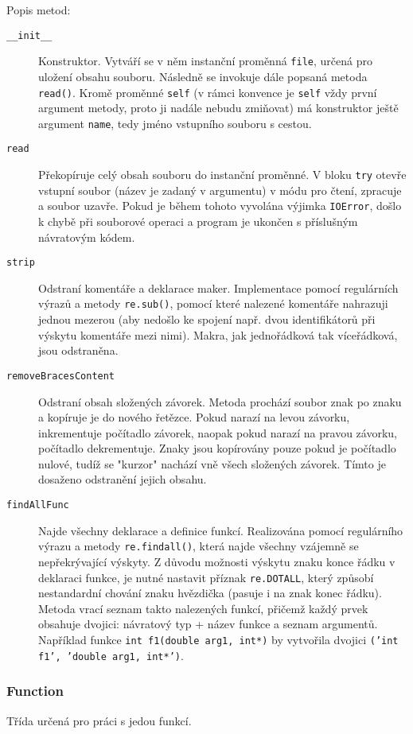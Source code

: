 \documentclass[a4paper, 10pt]{article}[19.04.2013]
\begin{document}
Popis metod:
\begin{description}
  \item [\texttt{\_\_init\_\_}] Konstruktor. Vytváří se v něm instanční proměnná \texttt{file}, 
  určená pro uložení obsahu souboru. Následně se invokuje dále popsaná metoda \texttt{read()}.
  Kromě proměnné \texttt{self} (v rámci konvence je \texttt{self} vždy první argument metody, 
  proto ji nadále nebudu zmiňovat) má konstruktor ještě argument \texttt{name}, tedy jméno
  vstupního souboru s cestou.
  \item [\texttt{read}] Překopíruje celý obsah souboru do instanční proměnné. V bloku
  \texttt{try} otevře vstupní soubor (název je zadaný v argumentu) v módu pro čtení, zpracuje
  a soubor uzavře. Pokud je během tohoto vyvolána výjimka \texttt{IOError}, došlo k chybě při
  souborové operaci a program je ukončen s příslušným návratovým kódem.
  \item [\texttt{strip}] Odstraní komentáře a deklarace maker. Implementace pomocí regulárních
  výrazů a metody \texttt{re.sub()}, pomocí které nalezené komentáře nahrazuji jednou mezerou
  (aby nedošlo ke spojení např. dvou identifikátorů při výskytu komentáře mezi nimi). Makra, 
  jak jednořádková tak víceřádková, jsou odstraněna.
  \item [\texttt{removeBracesContent}] Odstraní obsah složených závorek. Metoda prochází
  soubor znak po znaku a kopíruje je do nového řetězce. Pokud narazí na levou závorku, 
  inkrementuje počítadlo závorek, naopak pokud narazí na pravou závorku, počítadlo
  dekrementuje. Znaky jsou kopírovány pouze pokud je počítadlo nulové, tudíž se "kurzor"
  nachází vně všech složených závorek. Tímto je dosaženo odstranění jejich obsahu.
  \item [\texttt{findAllFunc}] Najde všechny deklarace a definice funkcí. Realizována
  pomocí regulárního výrazu a metody \texttt{re.findall()}, která najde všechny vzájemně
  se nepřekrývající výskyty. Z důvodu možnosti výskytu znaku konce řádku v deklaraci funkce,
  je nutné nastavit příznak \texttt{re.DOTALL}, který způsobí nestandardní chování znaku
  hvězdička (pasuje i na znak konec řádku). Metoda vrací seznam takto nalezených funkcí,
  přičemž každý prvek obsahuje dvojici: návratový typ + název funkce a seznam argumentů.
  Například funkce \texttt{int f1(double arg1, int*)} by vytvořila dvojici
  \texttt{('int f1', 'double arg1, int*')}.
\end{description}

\subsubsection*{{\bf Function}}
Třída určená pro práci s jedou funkcí.
\end{document}
